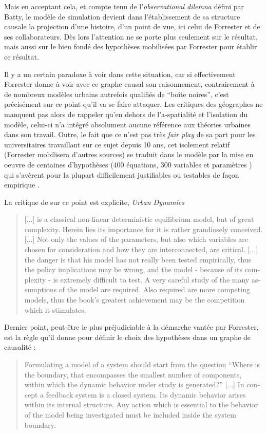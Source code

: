 Mais en acceptant cela, et compte tenu de l'\textit{observational dilemna} défini par Batty, le modèle de simulation devient dans l'établissement de sa structure causale la projection d'une histoire, d'un point de vue, ici celui de Forrester et de ses collaborateurs. Dès lors l'attention ne se porte plus seulement sur le résultat, mais aussi sur le bien fondé des hypothèses mobilisées par Forrester pour établir ce résultat.

Il y a un certain paradoxe à voir dans cette situation, car si effectivement Forrester donne à voir avec ce graphe causal son raisonnement, contrairement à de nombreux modèles urbains autrefois qualifiés de \enquote{boîte noires}, c'est précisément sur ce point qu'il va se faire attaquer. Les critiques des géographes ne manquent pas alors de rappeler qu'en dehors de l'a-spatialité et l'isolation du modèle, celui-ci n'a intégré absolument aucune référence aux théories urbaines dans son travail. Outre, le fait que ce n'est pas très \textit{fair play} de sa part pour les universitaires travaillant sur ce sujet depuis 10 ans, cet isolement relatif (Forrester mobilisera d'autres sources) se traduit dans le modèle par la mise en oeuvre de centaines d'hypothèses (400 équations, 300 variables et paramètres \autocite[63]{Pumain1989}) qui s'avèrent pour la plupart difficilement justifiables ou testables de façon empirique \autocite[307]{Batty1976}.

La critique de \textcite{Tobler1970a} sur ce point est explicite, \textit{Urban Dynamics} 

\foreignblockquote{english}[\cite{Tobler1970a}]{[...] is a classical non-linear deterministic equilibrium model, but of great complexity. Herein lies its importance for it is rather grandiosely conceived. [...] Not only the values of the parameters, but also which variables are chosen for consideration and how they are interconnected, are critical. [...] the danger is that his model has not really been tested empirically, thus the policy implications may be wrong, and the model - because of its complexity - is extremely difficult to test. A very careful study of the many assumptions of the model are required. Also required are more competing models, thus the book’s greatest achievement may be the competition which it stimulates.}

Dernier point, peut-être le plus préjudiciable à la démarche vantée par Forrester, est la règle qu'il donne pour définir le choix des hypothèses dans un graphe de causalité :

\foreignblockquote{english}[\cites{Forrester1968b, Richardson2011}]{Formulating a model of a system should start from the question \enquote{Where is the boundary, that encompasses the smallest number of components, within which the dynamic behavior under study is generated?} [...] In concept a feedback system is a closed system. Its dynamic behavior arises within its internal structure. Any action which is essential to the behavior of the model being investigated must be included inside the system boundary.} 

